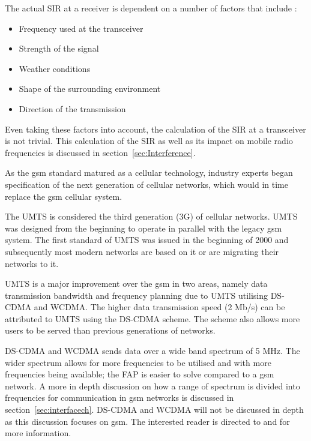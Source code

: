 The actual \gls{SIR} at a receiver is dependent on a number of factors that include \cite{GSMArchitectureProtocolsServices,Karen2004}:
\begin{itemize}
\item Frequency used at the transceiver
\item Strength of the signal
\item Weather conditions
\item Shape of the surrounding environment
\item Direction of the transmission
\end{itemize}
Even taking these factors into account, the calculation of the \gls{SIR} at a transceiver is not trivial. This calculation of the \gls{SIR} as well as its impact on mobile radio frequencies is discussed in section~\ref{sec:Interference}.

As the \gls{gsm} standard matured as a cellular technology, industry experts began specification of the next generation of cellular networks, which would in time replace the \gls{gsm} cellular system. 

The \gls{UMTS} is considered the third generation (3G) of cellular networks\cite{tabuglobalplanning3g,Eisenblatter}. \gls{UMTS} was designed from the beginning to operate in parallel with the legacy \gls{gsm} system. The first standard of \gls{UMTS} was issued in the beginning of 2000 and subsequently most modern networks are based on it or are migrating their networks to it\cite{tabuglobalplanning3g,Eisenblatter}.

UMTS is a major improvement over the \gls{gsm} in two areas, namely data transmission bandwidth and frequency planning due to \gls{UMTS} utilising \gls{DS-CDMA} and \gls{WCDMA}\cite{tabuglobalplanning3g,Eisenblatter}. The higher data transmission speed (2 Mb/s) can be attributed to \gls{UMTS} using the \gls{DS-CDMA} scheme\cite{tabuglobalplanning3g,Eisenblatter}. The scheme also allows more users to be served than previous generations of networks\cite{tabuglobalplanning3g,Eisenblatter}. 

DS-CDMA and \gls{WCDMA} sends data over a wide band spectrum of 5 MHz. The wider spectrum allows for more frequencies to be utilised and with more frequencies being available; the \gls{FAP} is easier to solve compared to a \gls{gsm} network\cite{tabuglobalplanning3g,Eisenblatter}\@. A more in depth discussion on how a range of spectrum is divided into frequencies for communication in \gls{gsm} networks is discussed in section~\ref{sec:interfacech}. \gls{DS-CDMA} and \gls{WCDMA} will not be discussed in depth as this discussion focuses on \gls{gsm}\@. The interested reader is directed to \cite{tabuglobalplanning3g} and \cite{wirelesstelcoMullet} for more information.

